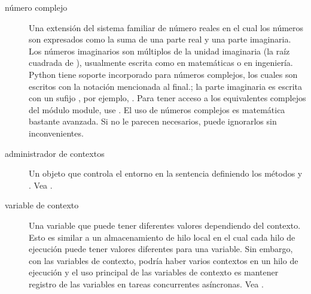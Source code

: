 \documentclass[a4,10pt,spanish]{sphinxmanual}
\begin{document}
\begin{description}
\item[{número complejo\label{\detokenize{glossary:term-complex-number}}}] \leavevmode
\sphinxAtStartPar
Una extensión del sistema familiar de número reales en el cual los números son expresados como la suma de una parte real y una parte imaginaria.  Los números imaginarios son múltiplos de la unidad imaginaria (la raíz cuadrada de ), usualmente escrita como  en matemáticas o  en ingeniería.  Python tiene soporte incorporado para números complejos, los cuales son escritos con la notación mencionada al final.; la parte imaginaria es escrita con un sufijo , por ejemplo, .  Para tener acceso a los equivalentes complejos del módulo  module, use .  El uso de números complejos es matemática bastante avanzada.  Si no le parecen necesarios, puede ignorarlos sin inconvenientes.

\item[{administrador de contextos\label{\detokenize{glossary:term-context-manager}}}] \leavevmode
\sphinxAtStartPar
Un objeto que controla el entorno en la sentencia  definiendo los métodos  y . Vea .

\item[{variable de contexto\label{\detokenize{glossary:term-context-variable}}}] \leavevmode
\sphinxAtStartPar
Una variable que puede tener diferentes valores dependiendo del contexto. Esto es similar a un almacenamiento de hilo local  en el cual cada hilo de ejecución puede tener valores diferentes para una variable. Sin embargo, con las variables de contexto, podría haber varios contextos en un hilo de ejecución y el uso principal de las variables de contexto es mantener registro de las variables en tareas concurrentes asíncronas. Vea .


\end{description}
\end{document}
